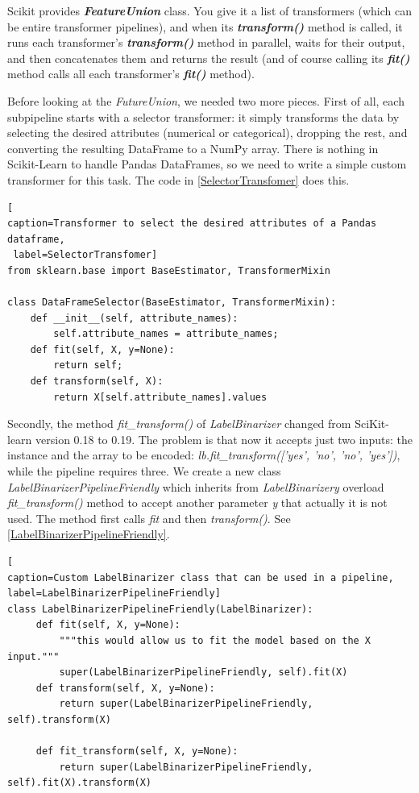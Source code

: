 \documentclass[12pt, letterpaper]{article}
\theoremstyle{definition}
\let\ti\textit
\let\tb\textbf
\begin{document}
Scikit provides \ti{\tb{FeatureUnion}} class. You give it a list of transformers (which can be entire transformer pipelines), and when its \ti{\tb{transform()}} method is called, it runs each transformer’s \ti{\tb{transform()}} method in parallel, waits for their output, and then concatenates them and returns the result (and of course calling its \ti{\tb{fit()}} method calls all each transformer’s \ti{\tb{fit()}} method). 

Before looking at the \ti{FutureUnion}, we needed two more pieces. First of all, each subpipeline starts with a selector transformer: it simply transforms the data by selecting the desired attributes (numerical or categorical), dropping the rest, and converting the resulting DataFrame to a NumPy array. There is nothing in Scikit-Learn to handle Pandas DataFrames, so we need to write a simple custom transformer for this task. The code in \autoref{SelectorTransfomer} does this.

\begin{lstlisting}[
caption=Transformer to select the desired attributes of a Pandas dataframe,
 label=SelectorTransfomer]
from sklearn.base import BaseEstimator, TransformerMixin

class DataFrameSelector(BaseEstimator, TransformerMixin):
    def __init__(self, attribute_names):
        self.attribute_names = attribute_names;
    def fit(self, X, y=None):
        return self;
    def transform(self, X):
        return X[self.attribute_names].values
\end{lstlisting}

Secondly, the method \ti{fit\_transform()} of \ti{LabelBinarizer} changed from SciKit-learn version 0.18 to 0.19. The problem is that now it accepts just two inputs: the instance and the array to be encoded: \ti{lb.fit\_transform(['yes', 'no', 'no', 'yes'])}, while the pipeline requires three.
We create a new class \ti{LabelBinarizerPipelineFriendly} which inherits from \ti{LabelBinarizery} overload \ti{fit\_transform()} method to accept another parameter \ti{y} that actually it is not used. The method first calls \ti{fit} and then \ti{transform()}. See \autoref{LabelBinarizerPipelineFriendly}.
\begin{lstlisting}[
caption=Custom LabelBinarizer class that can be used in a pipeline, 
label=LabelBinarizerPipelineFriendly]
class LabelBinarizerPipelineFriendly(LabelBinarizer):
     def fit(self, X, y=None):
         """this would allow us to fit the model based on the X input."""
         super(LabelBinarizerPipelineFriendly, self).fit(X)
     def transform(self, X, y=None):
         return super(LabelBinarizerPipelineFriendly, self).transform(X)

     def fit_transform(self, X, y=None):
         return super(LabelBinarizerPipelineFriendly, self).fit(X).transform(X)
\end{lstlisting}
\end{document}
